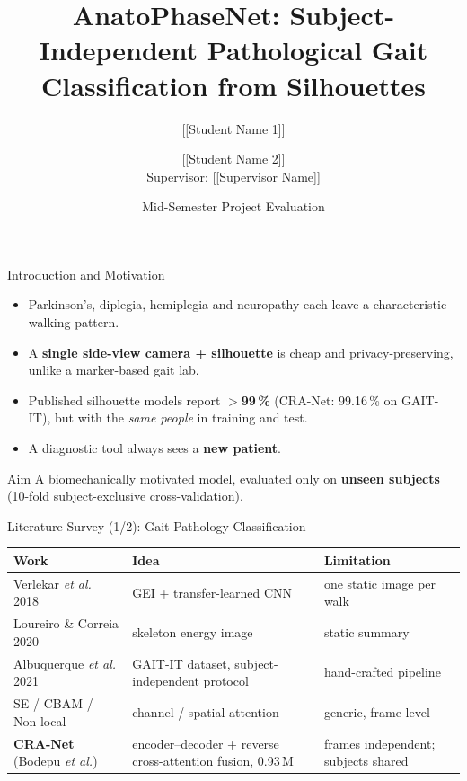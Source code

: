 \documentclass[aspectratio=169,10pt]{beamer}
\title[AnatoPhaseNet]{AnatoPhaseNet: Subject-Independent Pathological Gait
Classification from Silhouettes}
\author[Project Group]{[[Student Name 1]] \and [[Student Name 2]]\\[1mm]
\small Supervisor: [[Supervisor Name]]}
\institute{[[Department]], [[Institute]]}
\date{Mid-Semester Project Evaluation}
\begin{document}
\begin{frame}
\titlepage
\end{frame}

\begin{frame}{Introduction and Motivation}
\begin{itemize}
\item Parkinson's, diplegia, hemiplegia and neuropathy each leave a
characteristic walking pattern.
\item A \textbf{single side-view camera + silhouette} is cheap and
privacy-preserving, unlike a marker-based gait lab.
\item Published silhouette models report \textbf{$>$99\,\%} (CRA-Net: 99.16\,\%
on GAIT-IT), but with the \emph{same people} in training and test.
\item A diagnostic tool always sees a \textbf{new patient}.
\end{itemize}
\begin{block}{Aim}
A biomechanically motivated model, evaluated only on \textbf{unseen subjects}
(10-fold subject-exclusive cross-validation).
\end{block}
\end{frame}

\begin{frame}{Literature Survey (1/2): Gait Pathology Classification}
\small
\begin{tabular}{@{}p{3.4cm}p{6.0cm}p{4.0cm}@{}}
\toprule
Work & Idea & Limitation \\
\midrule
Verlekar \textit{et al.} 2018 & GEI + transfer-learned CNN & one static image per walk \\
Loureiro \& Correia 2020 & skeleton energy image & static summary \\
Albuquerque \textit{et al.} 2021 & GAIT-IT dataset, subject-independent protocol & hand-crafted pipeline \\
SE / CBAM / Non-local & channel / spatial attention & generic, frame-level \\
\textbf{CRA-Net} (Bodepu \textit{et al.}) & encoder--decoder + reverse cross-attention fusion, 0.93\,M & frames independent; subjects shared \\
\bottomrule
\end{tabular}
\end{frame}
\end{document}
